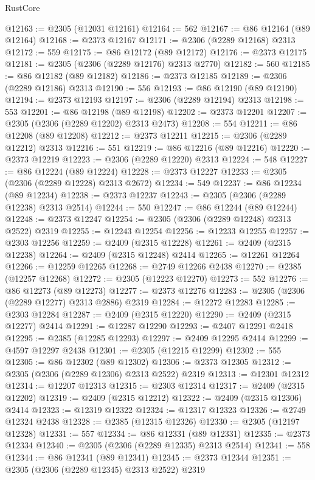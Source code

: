 \begin{lexlean}{RustCore}
\begin{coremodule}
@12163 := @2305 (@12031 @12161)
@12164 := 562
@12167 := @86 @12164 (@89 @12164)
@12168 := @2373 @12167
@12171 := @2306 (@2289 @12168) @2313
@12172 := 559
@12175 := @86 @12172 (@89 @12172)
@12176 := @2373 @12175
@12181 := @2305 (@2306 (@2289 @12176) @2313 @2770)
@12182 := 560
@12185 := @86 @12182 (@89 @12182)
@12186 := @2373 @12185
@12189 := @2306 (@2289 @12186) @2313
@12190 := 556
@12193 := @86 @12190 (@89 @12190)
@12194 := @2373 @12193
@12197 := @2306 (@2289 @12194) @2313
@12198 := 553
@12201 := @86 @12198 (@89 @12198)
@12202 := @2373 @12201
@12207 := @2305 (@2306 (@2289 @12202) @2313 @2473)
@12208 := 554
@12211 := @86 @12208 (@89 @12208)
@12212 := @2373 @12211
@12215 := @2306 (@2289 @12212) @2313
@12216 := 551
@12219 := @86 @12216 (@89 @12216)
@12220 := @2373 @12219
@12223 := @2306 (@2289 @12220) @2313
@12224 := 548
@12227 := @86 @12224 (@89 @12224)
@12228 := @2373 @12227
@12233 := @2305 (@2306 (@2289 @12228) @2313 @2672)
@12234 := 549
@12237 := @86 @12234 (@89 @12234)
@12238 := @2373 @12237
@12243 := @2305 (@2306 (@2289 @12238) @2313 @2514)
@12244 := 550
@12247 := @86 @12244 (@89 @12244)
@12248 := @2373 @12247
@12254 := @2305 (@2306 (@2289 @12248) @2313 @2522) @2319
@12255 := @12243 @12254
@12256 := @12233 @12255
@12257 := @2303 @12256
@12259 := @2409 (@2315 @12228)
@12261 := @2409 (@2315 @12238)
@12264 := @2409 (@2315 @12248) @2414
@12265 := @12261 @12264
@12266 := @12259 @12265
@12268 := @2749 @12266 @2438
@12270 := @2385 (@12257 @12268)
@12272 := @2305 (@12223 @12270)
@12273 := 552
@12276 := @86 @12273 (@89 @12273)
@12277 := @2373 @12276
@12283 := @2305 (@2306 (@2289 @12277) @2313 @2886) @2319
@12284 := @12272 @12283
@12285 := @2303 @12284
@12287 := @2409 (@2315 @12220)
@12290 := @2409 (@2315 @12277) @2414
@12291 := @12287 @12290
@12293 := @2407 @12291 @2418
@12295 := @2385 (@12285 @12293)
@12297 := @2409 @12295 @2414
@12299 := @4597 @12297 @2438
@12301 := @2305 (@12215 @12299)
@12302 := 555
@12305 := @86 @12302 (@89 @12302)
@12306 := @2373 @12305
@12312 := @2305 (@2306 (@2289 @12306) @2313 @2522) @2319
@12313 := @12301 @12312
@12314 := @12207 @12313
@12315 := @2303 @12314
@12317 := @2409 (@2315 @12202)
@12319 := @2409 (@2315 @12212)
@12322 := @2409 (@2315 @12306) @2414
@12323 := @12319 @12322
@12324 := @12317 @12323
@12326 := @2749 @12324 @2438
@12328 := @2385 (@12315 @12326)
@12330 := @2305 (@12197 @12328)
@12331 := 557
@12334 := @86 @12331 (@89 @12331)
@12335 := @2373 @12334
@12340 := @2305 (@2306 (@2289 @12335) @2313 @2514)
@12341 := 558
@12344 := @86 @12341 (@89 @12341)
@12345 := @2373 @12344
@12351 := @2305 (@2306 (@2289 @12345) @2313 @2522) @2319

\end{coremodule}
\end{lexlean}
